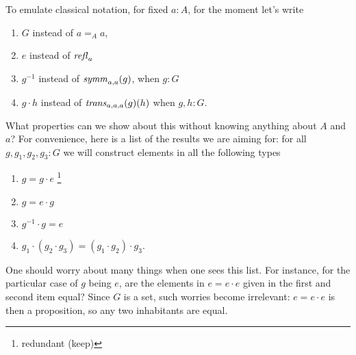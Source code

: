  To emulate classical notation, for fixed $a:A$,  for the moment let's write
 \begin{enumerate}
 \item $G$ instead of $a=_Aa$,
 \item $e$ instead of $\mathop{{\it refl}_{a}}{}$
 \item $g^{-1}$ instead of $\mathop{\mathit{symm}}_{a,a}(g)$, when $g:G$
 \item $g\cdot h$ instead of $\mathop{\mathit{trans}}_{a,a,a}(g)(h)$ when $g,h:G$.
 \end{enumerate}
 What properties can we show about this without knowing anything about $A$ and $a$? For convenience, here is a list of the results we are aiming for: for all $g,g_1,g_2,g_3:G$ we will construct elements in all the following types
 \begin{enumerate}
 \item $g=g\cdot e$ \footnote{redundant (keep)}
 \item $g=e\cdot g$
 \item $g^{-1}\cdot g=e$
 \item $g_1\cdot(g_2\cdot g_3)=(g_1\cdot g_2)\cdot g_3$.
 \end{enumerate}
 \begin{remark}
   One should worry about many things when one sees this list.  For instance, for the particular case of $g$ being $e$, are the elements in $e=e\cdot e$ given in the first and second item equal?  Since $G$ is a set, such worries become irrelevant: $e=e\cdot e$ is then a proposition, so any two inhabitants are equal.
 \end{remark}


